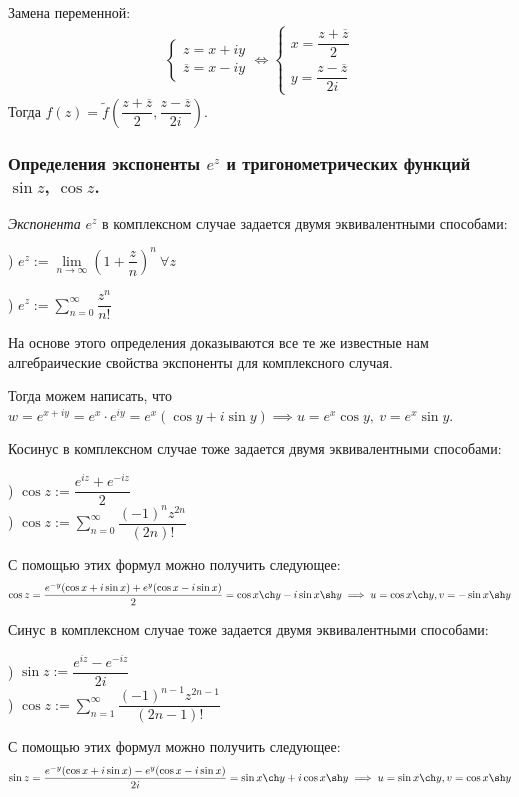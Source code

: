 Замена переменной:
 \begin{align*}
 \begin{cases}
 	z = x + iy \\
 	\overline{z} = x - iy
 \end{cases} \iff 
 \begin{cases}
 x = \dfrac{z + \overline{z}}{2} \\
 y = \dfrac{z - \overline{z}}{2i}
 \end{cases} 
 \end{align*}
 Тогда $f(z) = \widetilde{f}\left(\dfrac{z + \overline{z}}{2}, \dfrac{z - \overline{z}}{2i}\right)$.
 
 \subsubsection{Определения экспоненты $e^z$ и тригонометрических функций $\sin z$, $\cos z$.}
 
 \begin{definition*}  \textit{Экспонента} $e^z$ в комплексном случае задается двумя  эквивалентными способами:
 	
 	) $e^z := \lim\limits_{n \to \infty} \left(1 + \dfrac zn\right)^n\ \forall z$
 	
 	) $e^z := \sum_{n = 0}^{\infty} \dfrac{z^n}{n!}$
 		
 	На основе этого определения доказываются все те же известные нам алгебраические свойства экспоненты для комплексного случая. 
 \end{definition*}

Тогда можем написать, что $w = e^{x + iy} = e^x \cdot e^{iy} = e^x(\cos y + i\sin y) \implies u  = e^x\cos y,\ v = e^x\sin y$.

\begin{definition*} Косинус в комплексном случае тоже задается двумя эквивалентными способами:
	
	) $\cos z := \dfrac{e^{iz} + e^{-iz}}{2}$ \\
	
	) $\cos z := \sum_{n = 0}^{\infty} \dfrac{(-1)^n z^{2n}}{(2n)!}$
	
	С помощью этих формул можно получить следующее: $$
	\cos z = \dfrac{e^{-y}(\cos x + i\sin x) + e^{y}(\cos x - i\sin x)}{2} = \cos x \ch y - i \sin x \sh y \implies  u =  \cos x \ch y, v = -\sin x \sh y $$
\end{definition*} 


\begin{definition*} Синус в комплексном случае тоже задается двумя эквивалентными способами:
	
	) $\sin z := \dfrac{e^{iz} - e^{-iz}}{2i}$ \\
	
	) $\cos z := \sum_{n = 1}^{\infty} \dfrac{(-1)^{n - 1} z^{2n - 1}}{(2n - 1)!}$
	
	С помощью этих формул можно получить следующее: $$
	\sin z =  \dfrac{e^{-y}(\cos x + i\sin x) - e^{y}(\cos x - i\sin x)}{2i} = \sin x \ch y + i \cos x \sh y \implies  u =  \sin x \ch y, v = \cos x \sh y$$
\end{definition*} 


